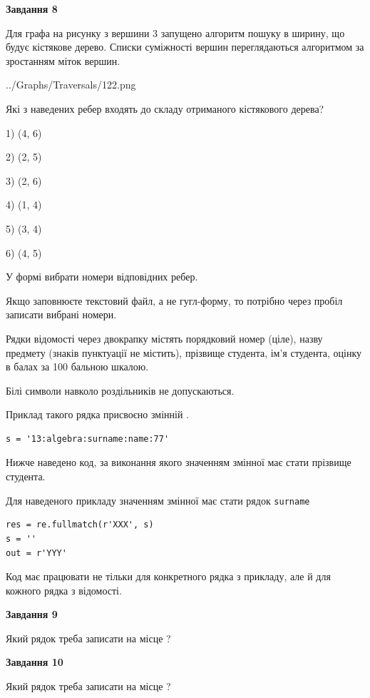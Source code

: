 \documentclass[12pt, ukrainian]{article}
\def\code#1{\Verb!#1!}
\begin{document}
{\begin {large}
{\begin {center}\textbf{Завдання 8}\end {center}}\par
Для графа на рисунку з вершини 3 запущено алгоритм пошуку в ширину, що будує кістякове дерево. Списки суміжності вершин переглядаються алгоритмом за зростанням міток вершин.\par
\begin{center}
	{../Graphs/Traversals/122.png}
\end{center}
\par Які з наведених ребер входять до складу отриманого кістякового дерева?\par
1) (4, 6)\par
2) (2, 5)\par
3) (2, 6)\par
4) (1, 4)\par
5) (3, 4)\par
6) (4, 5)\par
{\vskip 15pt} У формі вибрати номери відповідних ребер.


Якщо заповнюєте текстовий файл, а не гугл-форму, то потрібно через пробіл записа\-ти вибрані номери.\par
\newpage


Рядки відомості через двокрапку містять порядковий номер (ціле), назву предмету (знаків пунктуації не містить), прізвище студента, ім'я студента, оцінку в балах за 100 бальною шкалою.

Білі символи навколо роздільників не допускаються.

Приклад такого рядка присвоєно змінній .



\begin{verbatim}
s = '13:algebra:surname:name:77'
\end{verbatim}


Нижче наведено код, за виконання якого значенням змінної  має стати прізвище студента.

Для наведеного прикладу значенням змінної  має стати рядок \code{surname}



\begin{verbatim}
res = re.fullmatch(r'XXX', s)
s = ''
out = r'YYY'
\end{verbatim}


Код має працювати не тільки для конкретного рядка з прикладу, але й для кожного рядка з відомості.

{\begin {center}\textbf{Завдання 9}\end {center}}\par
Який рядок треба записати на місце  ?\par
\vspace{5mm}


{\begin {center}\textbf{Завдання 10}\end {center}}\par
Який рядок треба записати на місце  ?\par


\newpage


\end {large}}
\end{document}
